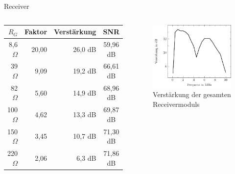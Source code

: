 \documentclass{beamer}
\begin{document}
%
%
\begin{frame}{Receiver}
\begin{columns}
	\begin{center}
    \begin{tabular}{r|r|r|c}
			$R_G$ & Faktor & Verstärkung & SNR \\ \hline
8,6 $\Omega$	& 20,00 & 26,0 dB & 59,96 dB \\ 
39 $\Omega$ 	& 9,09	& 19,2 dB & 66,61 dB \\
82 $\Omega$ 	& 5,60	& 14,9 dB & 68,96 dB \\
100 $\Omega$ 	& 4,62	& 13,3 dB & 69,87 dB \\
150 $\Omega$ 	& 3,45	& 10,7 dB & 71,30 dB \\
220 $\Omega$ 	& 2,06	& 6,3  dB & 71,86 dB
\end{tabular}
  \end{center}%
		\begin{figure}[t]
			\includegraphics[width=\textwidth, trim= 0mm 0mm 0mm 0mm, clip=true]{images/tests/bandpassDB}
  			\caption{Verstärkung der gesamten Receivermoduls}
		\end{figure}
	\end{columns}
\end{frame}
%
%
\end{document}
